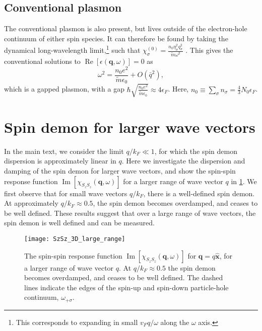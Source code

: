\documentclass[aps,prb,reprint,twocolumns,superscriptaddress,nofootinbib]{revtex4-2}
\DeclareMathOperator{\Imm}{Im}
\DeclareMathOperator{\Ree}{Re}
\newcommand{\mdos}{\tilde{m}}
\newcommand{\kF}{k_{F}}
\begin{document}
	\subsection{Conventional plasmon}
	The conventional plasmon is also present, but lives outside of the electron-hole continuum of either spin species. It can therefore be found by taking the dynamical long-wavelength limit,\footnote{This corresponds to expanding in small $v_Fq/\omega$ along the $\omega$ axis. } such that $\chi_{\sigma}^{(0)}=\frac{n_0 \eta_\sigma^2 q_\sigma^2}{\mdos \omega^2}$ \cite{giulianiQuantumTheoryElectron2005}. This gives the conventional solutions to $\Ree[\epsilon(\bm q,\omega)]=0$ as 
	\begin{equation}
		\omega^2 = \frac{n_0 e^2}{\mdos\epsilon_0} + O(\bar q^2),
	\end{equation}
	which is a gapped plasmon, with a gap $\hbar\sqrt{\frac{n_0 e^2}{\mdos\epsilon_0}}\approx 4\epsilon_F$. Here, $n_0\equiv\sum_\sigma n_\sigma=\frac{4}{3}N_0\epsilon_F$. 
	
	\section{Spin demon for larger wave vectors}
	In the main text, we consider the limit $q/\kF\ll1$, for which the spin demon dispersion is approximately linear in $q$. Here we investigate the dispersion and damping of the spin demon for larger wave vectors, and show the spin-spin response function $\Imm[\chi_{S_zS_z}(\bm q,\omega)]$ for a larger range of wave vector $q$ in \cref{fig:larger-q}. We first observe that for small wave vectors $q/\kF$, there is a well-defined spin demon. At approximately $q/\kF\approx 0.5$, the spin demon becomes overdamped, and ceases to be well defined. These results suggest that over a large range of wave vectors, the spin demon is well defined and can be measured.
	
	\begin{figure}
		\texttt{[image: SzSz\_3D\_large\_range]}
		\caption{The spin-spin response function $\Imm[\chi_{S_zS_z}(\bm q,\omega)]$ for $\bm q =q\hat{\bm x}$, for a larger range of wave vector $q$. At $q/\kF\approx 0.5$ the spin demon becomes overdamped, and ceases to be well defined. The dashed lines indicate the edges of the spin-up and spin-down particle-hole continuum, $\omega_{+\sigma}$. }
		\label{fig:larger-q}
	\end{figure}
	
\end{document}
